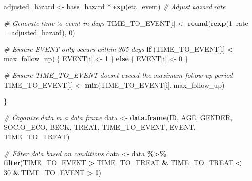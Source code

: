 \documentclass[
]{book}
\newenvironment{Shaded}{\begin{snugshade}}{\end{snugshade}}
\newcommand{\AttributeTok}[1]{\textcolor[rgb]{0.13,0.29,0.53}{#1}}
\newcommand{\CommentTok}[1]{\textcolor[rgb]{0.56,0.35,0.01}{\textit{#1}}}
\newcommand{\ControlFlowTok}[1]{\textcolor[rgb]{0.13,0.29,0.53}{\textbf{#1}}}
\newcommand{\DecValTok}[1]{\textcolor[rgb]{0.00,0.00,0.81}{#1}}
\newcommand{\FunctionTok}[1]{\textcolor[rgb]{0.13,0.29,0.53}{\textbf{#1}}}
\newcommand{\NormalTok}[1]{#1}
\newcommand{\OtherTok}[1]{\textcolor[rgb]{0.56,0.35,0.01}{#1}}
\newcommand{\SpecialCharTok}[1]{\textcolor[rgb]{0.81,0.36,0.00}{\textbf{#1}}}
\begin{document}
\begin{Shaded}
\begin{Highlighting}[]
\NormalTok{  adjusted\_hazard }\OtherTok{\textless{}{-}}\NormalTok{ base\_hazard }\SpecialCharTok{*} \FunctionTok{exp}\NormalTok{(eta\_event)  }\CommentTok{\# Adjust hazard rate}
  
  \CommentTok{\# Generate time to event in days}
\NormalTok{  TIME\_TO\_EVENT[i] }\OtherTok{\textless{}{-}} \FunctionTok{round}\NormalTok{(}\FunctionTok{rexp}\NormalTok{(}\DecValTok{1}\NormalTok{, }\AttributeTok{rate =}\NormalTok{ adjusted\_hazard), }\DecValTok{0}\NormalTok{)}
  
  \CommentTok{\# Ensure EVENT only occurs within 365 days}
  \ControlFlowTok{if}\NormalTok{ (TIME\_TO\_EVENT[i] }\SpecialCharTok{\textless{}}\NormalTok{ max\_follow\_up) \{}
\NormalTok{    EVENT[i] }\OtherTok{\textless{}{-}} \DecValTok{1}
\NormalTok{  \} }\ControlFlowTok{else}\NormalTok{ \{}
\NormalTok{    EVENT[i] }\OtherTok{\textless{}{-}} \DecValTok{0}
\NormalTok{  \}}
  
  \CommentTok{\# Ensure TIME\_TO\_EVENT doesn\textquotesingle{}t exceed the maximum follow{-}up period}
\NormalTok{  TIME\_TO\_EVENT[i] }\OtherTok{\textless{}{-}} \FunctionTok{min}\NormalTok{(TIME\_TO\_EVENT[i], max\_follow\_up)}
  
\NormalTok{\}}

\CommentTok{\# Organize data in a data frame}
\NormalTok{data }\OtherTok{\textless{}{-}} \FunctionTok{data.frame}\NormalTok{(ID, AGE, GENDER, SOCIO\_ECO, BECK, TREAT, TIME\_TO\_EVENT, EVENT, TIME\_TO\_TREAT)}

\CommentTok{\# Filter data based on conditions}
\NormalTok{data }\OtherTok{\textless{}{-}}\NormalTok{ data }\SpecialCharTok{\%\textgreater{}\%}
  \FunctionTok{filter}\NormalTok{(TIME\_TO\_EVENT }\SpecialCharTok{\textgreater{}}\NormalTok{ TIME\_TO\_TREAT }\SpecialCharTok{\&}\NormalTok{ TIME\_TO\_TREAT }\SpecialCharTok{\textless{}} \DecValTok{30} \SpecialCharTok{\&}\NormalTok{ TIME\_TO\_EVENT }\SpecialCharTok{\textgreater{}} \DecValTok{0}\NormalTok{)}


\end{Highlighting}
\end{Shaded}
\end{document}
